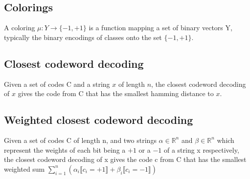 \documentclass[11pt]{article}
\begin{document}
    \subsection{Colorings}
        A coloring $\mu : Y \rightarrow \{-1, +1\}$ is a function mapping a set of binary vectors Y, typically the binary encodings of classes onto the set $\{-1,+1\}$.
    \subsection{Closest codeword decoding}
    Given a set of codes C and a string $x$ of length $n$, the closest codeword decoding of $x$ gives the code from C that has the smallest hamming distance to $x$.
    \subsection{Weighted closest codeword decoding}
    Given a set of codes C of length n, and two strings $\alpha \in \mathbb{R}^n$ and $\beta \in \mathbb{R}^n$ which represent the weights of each bit being a $+1$ or a $-1$ of a string x respectively, the closest codeword decoding of x gives the code c from C that has the smallest weighted sum $\sum_{i=1}^n (\alpha_i\llbracket c_i = +1 \rrbracket + \beta_i\llbracket c_i = -1 \rrbracket)$
\end{document}
